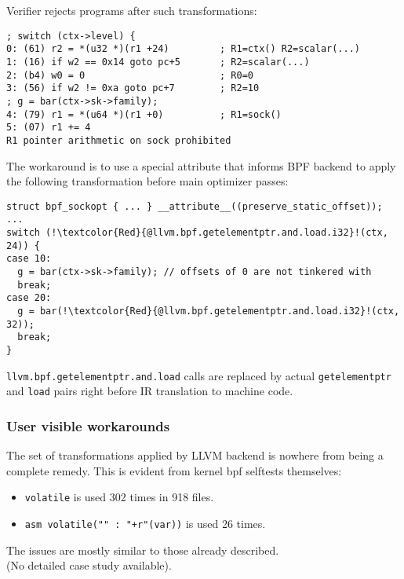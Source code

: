 \documentclass{beamer}
\newcommand{\code}[1]{\texttt{#1}}
\begin{document}
\begin{frame}
  Verifier rejects programs after such transformations:

  \begin{verbatim}
; switch (ctx->level) {
0: (61) r2 = *(u32 *)(r1 +24)         ; R1=ctx() R2=scalar(...)
1: (16) if w2 == 0x14 goto pc+5       ; R2=scalar(...)
2: (b4) w0 = 0                        ; R0=0
3: (56) if w2 != 0xa goto pc+7        ; R2=10
; g = bar(ctx->sk->family);
4: (79) r1 = *(u64 *)(r1 +0)          ; R1=sock()
5: (07) r1 += 4
R1 pointer arithmetic on sock prohibited
  \end{verbatim}

  \framebreak

  The workaround is to use a special attribute that informs BPF
  backend to apply the following transformation before main optimizer
  passes:

  \begin{verbatim}
struct bpf_sockopt { ... } __attribute__((preserve_static_offset));
...
switch (!\textcolor{Red}{@llvm.bpf.getelementptr.and.load.i32}!(ctx, 24)) {
case 10:
  g = bar(ctx->sk->family); // offsets of 0 are not tinkered with
  break;
case 20:
  g = bar(!\textcolor{Red}{@llvm.bpf.getelementptr.and.load.i32}!(ctx, 32));
  break;
}
  \end{verbatim}

  \code{llvm.bpf.getelementptr.and.load} calls are replaced by actual
  \code{getelementptr} and \code{load} pairs right before IR
  translation to machine code.

\end{frame}

\begin{frame}
\frametitle{User visible workarounds}

The set of transformations applied by LLVM backend is
nowhere from being a complete remedy. This is evident
from kernel bpf selftests themselves:

\begin{itemize}
\item \code{volatile} is used 302 times in 918 files.
\item \code{asm volatile("" : "+r"(var))} is used 26 times.
\end{itemize}

The issues are mostly similar to those already described. \\
(No detailed case study available).

\end{frame}
\end{document}
